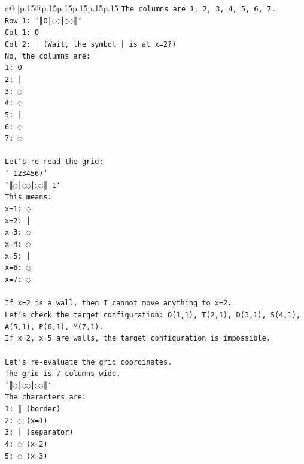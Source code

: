 \documentclass{article}
\begin{document}
{\begin{supertabular}{c@{$\;$}|p{.15\linewidth}@{}p{.15\linewidth}p{.15\linewidth}p{.15\linewidth}p{.15\linewidth}p{.15\linewidth}}
{{{\texttt{The columns are 1, 2, 3, 4, 5, 6, 7.} \\
\texttt{Row 1: `║O│◌◌│◌◌║`} \\
\texttt{Col 1: O} \\
\texttt{Col 2: │ (Wait, the symbol │ is at x=2?)} \\
\texttt{No, the columns are:} \\
\texttt{1: O} \\
\texttt{2: │} \\
\texttt{3: ◌} \\
\texttt{4: ◌} \\
\texttt{5: │} \\
\texttt{6: ◌} \\
\texttt{7: ◌} \\
\\ 
\texttt{Let's re{-}read the grid:} \\
\texttt{` 1234567`} \\
\texttt{`║◌│◌◌│◌◌║ 1`} \\
\texttt{This means:} \\
\texttt{x=1: ◌} \\
\texttt{x=2: │} \\
\texttt{x=3: ◌} \\
\texttt{x=4: ◌} \\
\texttt{x=5: │} \\
\texttt{x=6: ◌} \\
\texttt{x=7: ◌} \\
\\ 
\texttt{If x=2 is a wall, then I cannot move anything to x=2.} \\
\texttt{Let's check the target configuration: O(1,1), T(2,1), D(3,1), S(4,1), A(5,1), P(6,1), M(7,1).} \\
\texttt{If x=2, x=5 are walls, the target configuration is impossible.} \\
\\ 
\texttt{Let's re{-}evaluate the grid coordinates.} \\
\texttt{The grid is 7 columns wide.} \\
\texttt{`║◌│◌◌│◌◌║`} \\
\texttt{The characters are:} \\
\texttt{1: ║ (border)} \\
\texttt{2: ◌ (x=1)} \\
\texttt{3: │ (separator)} \\
\texttt{4: ◌ (x=2)} \\
\texttt{5: ◌ (x=3)} \\
}}}
\end{supertabular}}
\end{document}
